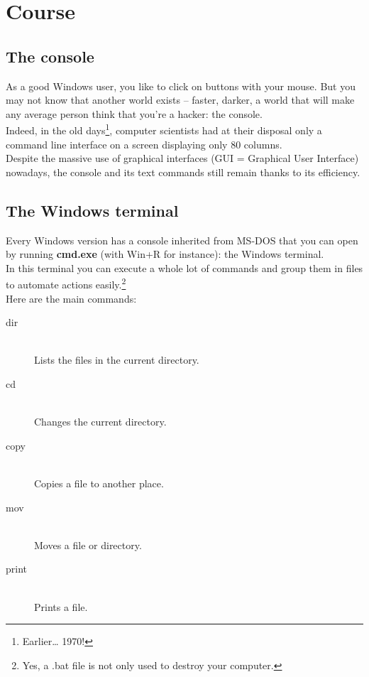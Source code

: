 \section{Course}

\subsection{The console}
As a good Windows user, you like to click on buttons with your mouse.
But you may not know that another world exists -- faster, darker, a world that will make
any average person think that you're a hacker: the console.\\
Indeed, in the old days\footnote{Earlier\ldots{} 1970!}, computer scientists had at their disposal only a command line interface on a screen displaying only 80 columns.\\
Despite the massive use of graphical interfaces (GUI = Graphical User
Interface) nowadays, the console and its text commands still remain thanks to its
efficiency.

\subsection{The Windows terminal}
Every Windows version has a console inherited from MS-DOS
that you can open by running \textbf{cmd.exe} (with Win+R for instance):
the Windows terminal.\\
In this terminal you can execute a whole lot of commands and group them
in files to automate actions easily.\footnote{Yes, a .bat file is not only used to destroy your computer.}\\
Here are the main commands:

\begin{description}
    \item[dir] \hfill \\
        Lists the files in the current directory.
    \item[cd] \hfill \\
        Changes the current directory.
    \item[copy] \hfill \\
        Copies a file to another place.
    \item[mov] \hfill \\
        Moves a file or directory.
    \item[print] \hfill \\
        Prints a file.
\end{description}

